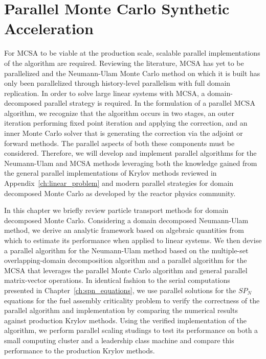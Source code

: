 \chapter{Parallel Monte Carlo Synthetic Acceleration}
\label{ch:parallel_methods}
For MCSA to be viable at the production scale, scalable parallel
implementations of the algorithm are required. Reviewing the
literature, MCSA has yet to be parallelized and the Neumann-Ulam Monte
Carlo method on which it is built has only been parallelized through
history-level parallelism with full domain replication. In order to
solve large linear systems with MCSA, a domain-decomposed parallel
strategy is required. In the formulation of a parallel MCSA algorithm,
we recognize that the algorithm occurs in two stages, an outer
iteration performing fixed point iteration and applying the
correction, and an inner Monte Carlo solver that is generating the
correction via the adjoint or forward methods. The parallel aspects of
both these components must be considered. Therefore, we will develop
and implement parallel algorithms for the Neumann-Ulam and MCSA
methods leveraging both the knowledge gained from the general parallel
implementations of Krylov methods reviewed in
Appendix~\ref{ch:linear_problem} and modern parallel strategies for
domain decomposed Monte Carlo as developed by the reactor physics
community.

In this chapter we briefly review particle transport methods for
domain decomposed Monte Carlo. Considering a domain decomposed
Neumann-Ulam method, we derive an analytic framework based on
algebraic quantities from which to estimate its performance when
applied to linear systems. We then devise a parallel algorithm for the
Neumann-Ulam method based on the multiple-set overlapping-domain
decomposition algorithm and a parallel algorithm for the MCSA that
leverages the parallel Monte Carlo algorithm and general parallel
matrix-vector operations. In identical fashion to the serial
computations presented in Chapter~\ref{ch:spn_equations}, we use
parallel solutions for the $SP_N$ equations for the fuel assembly
criticality problem to verify the correctness of the parallel
algorithm and implementation by comparing the numerical results
against production Krylov methods. Using the verified implementation
of the algorithm, we perform parallel scaling studings to test its
performance on both a small computing cluster and a leadership class
machine and compare this performance to the production Krylov methods.

